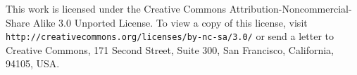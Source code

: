 \documentclass[11pt,letterpaper]{article}
\begin{document}
\vspace{1in}
\begin{center}
\begin{boxedminipage}{0.65\textwidth}
  This work is licensed under the Creative Commons Attribution-Noncommercial-Share Alike 3.0 Unported License. To view a copy of this license, visit \texttt{http://creativecommons.org/licenses/by-nc-sa/3.0/} or send a letter to Creative Commons, 171 Second Street, Suite 300, San Francisco, California, 94105, USA.
\end{boxedminipage}
\end{center}
\end{document}

